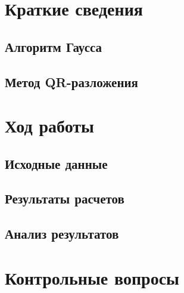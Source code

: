 \documentclass[12pt, a4paper]{article}
\begin{document}
	

	
	\newpage
	
	\section{Краткие сведения}
	\subsection{Алгоритм Гаусса}
	\subsection{Метод QR-разложения}
	\section{Ход работы}
	\subsection{Исходные данные}
	\subsection{Результаты расчетов}
	\subsection{Анализ результатов}
	\section{Контрольные вопросы}
	
\end{document}
